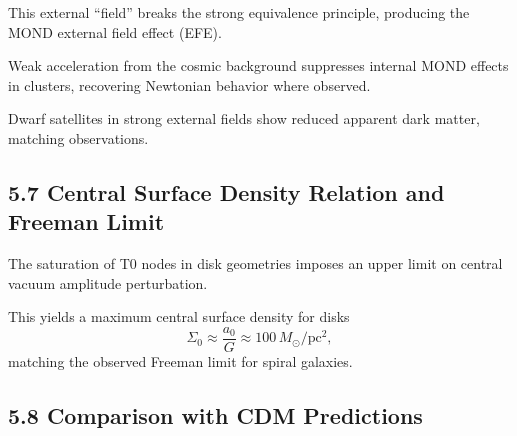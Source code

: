 	This external ``field'' breaks the strong equivalence principle, producing the MOND external field effect (EFE).
	
	Weak acceleration from the cosmic background suppresses internal MOND effects in clusters, recovering Newtonian behavior where observed.
	
	Dwarf satellites in strong external fields show reduced apparent dark matter, matching observations.
	
	\subsection{5.7 Central Surface Density Relation and Freeman Limit}
	
	The saturation of T0 nodes in disk geometries imposes an upper limit on central vacuum amplitude perturbation.
	
	This yields a maximum central surface density for disks
	\[
	\Sigma_0 \approx \frac{a_0}{G} \approx 100 \, M_\odot / \text{pc}^2,
	\]
	matching the observed Freeman limit for spiral galaxies.
	
	\subsection{5.8 Comparison with CDM Predictions}
	
	\begin{table}[htbp]
		\centering
		\caption{Galactic scale predictions}
		\label{tab:galactic}
	\end{table}
	
